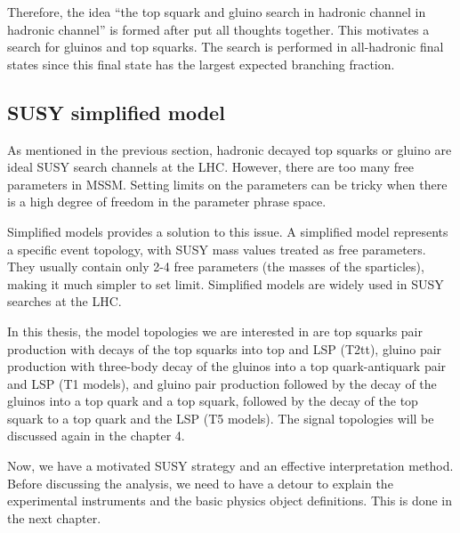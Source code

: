 Therefore, the idea “the top squark and gluino search in hadronic channel in hadronic channel” is formed after put all thoughts together. This motivates a search for gluinos and top squarks.  The search is performed in all-hadronic final states since this final state has the largest expected branching fraction.

\clearpage
\subsection{SUSY simplified model}
As mentioned in the previous section, hadronic decayed top squarks or gluino are ideal SUSY search channels at the LHC. However, there are too many free parameters in MSSM. Setting limits on the parameters can be tricky when there is a high degree of freedom in the parameter phrase space. 

Simplified models\cite{Alwall:2008ag} provides a solution to this issue. A simplified model represents a specific event topology, with SUSY mass values treated as free parameters. They usually contain only 2-4 free parameters (the masses of the sparticles), making it much simpler to set limit. Simplified models are widely used in SUSY searches at the LHC\cite{CMS-SMS-paper}.

In this thesis, the model topologies we are interested in are top squarks pair production with decays of the top squarks into top and LSP (T2tt), gluino pair production with three-body decay of the gluinos into a top quark-antiquark pair and LSP (T1 models), and gluino pair production followed by the decay of the gluinos into a top quark and a top squark, followed by the decay of the top squark to a top quark and the LSP (T5 models). The signal topologies will be discussed again in the chapter 4.

Now, we have a motivated SUSY strategy and an effective interpretation method. Before discussing the analysis, we need to have a detour to explain the experimental instruments and the basic physics object definitions. This is done in the next chapter. 
